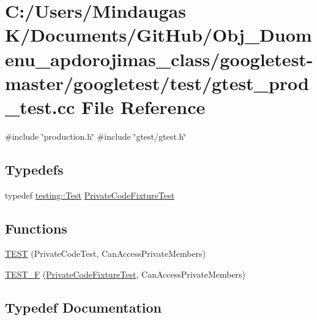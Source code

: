 \hypertarget{googletest-master_2googletest_2test_2gtest__prod__test_8cc}{}\section{C\+:/\+Users/\+Mindaugas K/\+Documents/\+Git\+Hub/\+Obj\+\_\+\+Duomenu\+\_\+apdorojimas\+\_\+class/googletest-\/master/googletest/test/gtest\+\_\+prod\+\_\+test.cc File Reference}
\label{googletest-master_2googletest_2test_2gtest__prod__test_8cc}
{\ttfamily \#include \char`\"{}production.\+h\char`\"{}}\newline
{\ttfamily \#include \char`\"{}gtest/gtest.\+h\char`\"{}}\newline
\subsection*{Typedefs}
\begin{DoxyCompactItemize}
\item 
typedef \mbox{\hyperlink{classtesting_1_1_test}{testing\+::\+Test}} \mbox{\hyperlink{googletest-master_2googletest_2test_2gtest__prod__test_8cc_a89debba10c803e339ce0f9b0b34a2267}{Private\+Code\+Fixture\+Test}}
\end{DoxyCompactItemize}
\subsection*{Functions}
\begin{DoxyCompactItemize}
\item 
\mbox{\hyperlink{googletest-master_2googletest_2test_2gtest__prod__test_8cc_a8e307a199011c2979d4a63464d245f4a}{T\+E\+ST}} (Private\+Code\+Test, Can\+Access\+Private\+Members)
\item 
\mbox{\hyperlink{googletest-master_2googletest_2test_2gtest__prod__test_8cc_a5e21e7e8dd53f2de05e9e6941b6612d3}{T\+E\+S\+T\+\_\+F}} (\mbox{\hyperlink{googletest-master_2googletest_2test_2gtest__prod__test_8cc_a89debba10c803e339ce0f9b0b34a2267}{Private\+Code\+Fixture\+Test}}, Can\+Access\+Private\+Members)
\end{DoxyCompactItemize}


\subsection{Typedef Documentation}
\mbox{\label{googletest-master_2googletest_2test_2gtest__prod__test_8cc_a89debba10c803e339ce0f9b0b34a2267}} 
